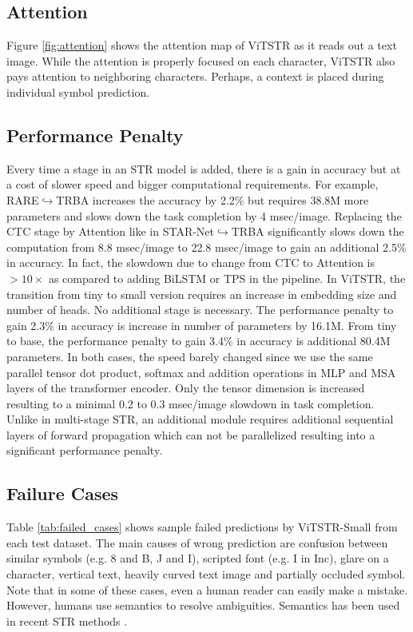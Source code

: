 \documentclass[runningheads]{llncs}
\begin{document}
\subsection{Attention}
Figure \ref{fig:attention} shows the attention map of ViTSTR as it reads out a text image. While the attention is properly focused on each character, ViTSTR also pays attention to neighboring characters. Perhaps, a context is placed during individual symbol prediction.

\subsection{Performance Penalty}
Every time a stage in an STR model is added, there is a gain in accuracy but at a cost of slower speed and bigger computational requirements. For example, RARE$\hookrightarrow$TRBA increases the accuracy by 2.2\% but requires 38.8M more parameters and slows down the task completion by 4 msec/image. Replacing the CTC stage by Attention like in STAR-Net$\hookrightarrow$TRBA significantly slows down the computation from 8.8 msec/image to 22.8 msec/image to gain an additional 2.5\% in accuracy. In fact, the slowdown due to change from CTC to Attention is $>10\times$ as compared to adding BiLSTM or TPS in the pipeline. In ViTSTR, the transition from tiny to small version requires an increase in embedding size and number of heads. No additional stage is necessary. The performance penalty to gain 2.3\% in accuracy is increase in number of parameters by 16.1M. From tiny to base, the performance penalty to gain 3.4\% in accuracy is additional 80.4M parameters. In both cases, the speed barely changed since we use the same parallel tensor dot product, softmax and addition operations in MLP and MSA layers of the transformer encoder. Only the tensor dimension is increased resulting to a minimal 0.2 to 0.3 msec/image slowdown in task completion.  Unlike in multi-stage STR, an additional module requires additional sequential layers of forward propagation which can not be parallelized resulting into a significant performance penalty.

\subsection{Failure Cases}
Table \ref{tab:failed_cases} shows sample failed predictions by ViTSTR-Small from each test dataset. The main causes of wrong prediction are confusion between similar symbols (e.g. 8 and B, J and I), scripted font (e.g. I in Inc), glare on a character, vertical text, heavily curved text image and partially occluded symbol. Note that in some of these cases, even a human reader can easily make a mistake. However, humans use semantics to resolve ambiguities. Semantics has been used in recent STR methods \cite{qiao2020seed,yu2020towards}.
\end{document}
